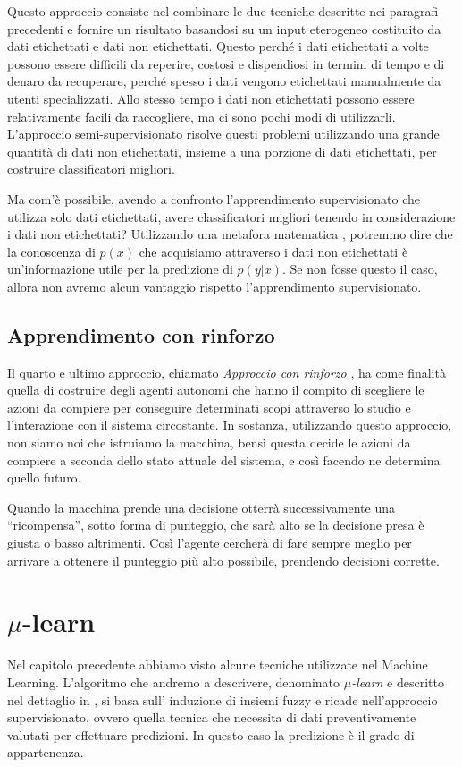 \documentclass[a4paper,12pt]{report}
\begin{document}
Questo approccio consiste nel combinare le due tecniche descritte nei paragrafi precedenti e fornire un risultato basandosi su un input eterogeneo costituito da dati etichettati e dati non etichettati.
Questo perché i dati etichettati a volte possono essere difficili da reperire, costosi e dispendiosi in termini di tempo e di denaro da recuperare, perché spesso i dati vengono etichettati manualmente da utenti specializzati. Allo stesso tempo i dati non etichettati possono essere relativamente facili da raccogliere, ma ci sono pochi modi di utilizzarli. 
L'approccio semi-supervisionato risolve questi problemi utilizzando una grande quantità di dati non etichettati, insieme a una porzione di dati etichettati, per costruire classificatori migliori. 

Ma com'è possibile, avendo a confronto l'apprendimento supervisionato che utilizza solo dati etichettati, avere classificatori migliori tenendo in considerazione i dati non etichettati?
Utilizzando una metafora matematica \cite{supervisedlearning}, potremmo dire che la conoscenza di $p(x)$ che acquisiamo attraverso i dati non etichettati è un'informazione utile per la predizione di $p(y|x)$. Se non fosse questo il caso, allora non avremo alcun vantaggio rispetto l'apprendimento supervisionato.

\subsection*{Apprendimento con rinforzo}
Il quarto e ultimo approccio, chiamato \textit{Approccio con rinforzo} \cite{Reinforcement_learning}, ha come finalità quella di costruire degli agenti autonomi che hanno il compito di scegliere le azioni da compiere per conseguire determinati scopi attraverso lo studio e l'interazione con il sistema circostante.
In sostanza, utilizzando questo approccio, non siamo noi che istruiamo la macchina, bensì questa decide le azioni da compiere a seconda dello stato attuale del sistema, e così facendo ne determina quello futuro.

Quando la macchina prende una decisione otterrà successivamente una “ricompensa”, sotto forma di punteggio, che sarà alto se la decisione presa è giusta o basso altrimenti. Così l'agente cercherà di fare sempre meglio per arrivare a ottenere il punteggio più alto possibile, prendendo decisioni corrette.


\section{\texorpdfstring{$\mu$}{mu}-learn}
Nel capitolo precedente abbiamo visto alcune tecniche utilizzate nel Machine Learning. L’algoritmo che andremo a descrivere, denominato \textit{$\mu$-learn} e descritto nel dettaglio in \cite{mulearn}, si basa sull’ induzione di insiemi fuzzy e ricade nell’approccio supervisionato, ovvero quella tecnica che necessita di dati preventivamente valutati per effettuare predizioni. In questo caso la predizione è il grado di appartenenza.
\bigskip
\end{document}
